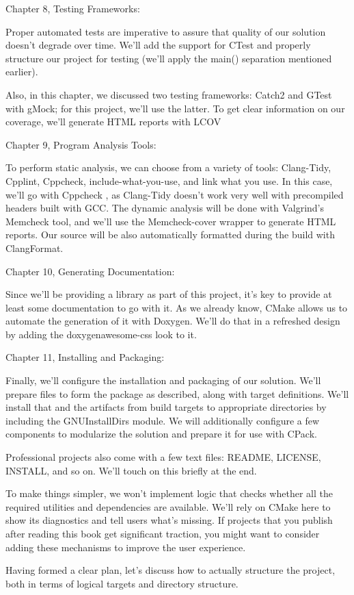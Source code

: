 Chapter 8, Testing Frameworks:

Proper automated tests are imperative to assure that quality of our solution doesn't degrade over time. We'll add the support for CTest and properly structure our project for testing (we'll apply the main() separation mentioned earlier).

Also, in this chapter, we discussed two testing frameworks: Catch2 and GTest with gMock; for this project, we'll use the latter. To get clear information on our coverage, we'll generate HTML reports with LCOV

Chapter 9, Program Analysis Tools:

To perform static analysis, we can choose from a variety of tools: Clang-Tidy, Cpplint, Cppcheck, include-what-you-use, and link what you use. In this case, we'll go with Cppcheck , as Clang-Tidy doesn't work very well with precompiled headers built with GCC. The dynamic analysis will be done with Valgrind's Memcheck tool, and we'll use the Memcheck-cover wrapper to generate HTML reports. Our source will be also automatically formatted during the build with ClangFormat.

Chapter 10, Generating Documentation:

Since we'll be providing a library as part of this project, it's key to provide at least some documentation to go with it. As we already know, CMake allows us to automate the generation of it with Doxygen. We'll do that in a refreshed design by adding the doxygenawesome-css look to it.

Chapter 11, Installing and Packaging:

Finally, we'll configure the installation and packaging of our solution. We'll prepare files to form the package as described, along with target definitions. We'll install that and the artifacts from build targets to appropriate directories by including the GNUInstallDirs module. We will additionally configure a few components to modularize the solution and prepare it for use with CPack.

Professional projects also come with a few text files: README, LICENSE, INSTALL, and so on. We'll touch on this briefly at the end.

\begin{tcolorbox}[colback=blue!5!white,colframe=blue!75!black,title=Note]
To make things simpler, we won't implement logic that checks whether all the required utilities and dependencies are available. We'll rely on CMake here to show its diagnostics and tell users what's missing. If projects that you publish after reading this book get significant traction, you might want to consider adding these mechanisms to improve the user experience.
\end{tcolorbox}

Having formed a clear plan, let's discuss how to actually structure the project, both in terms of logical targets and directory structure.
















